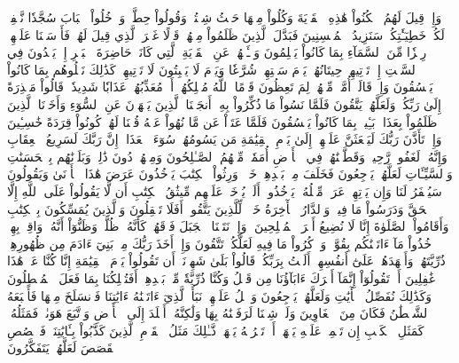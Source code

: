 وَإِذۡ قِيلَ لَهُمُ ٱسۡكُنُواْ هَٰذِهِ ٱلۡقَرۡيَةَ وَكُلُواْ مِنۡهَا حَيۡثُ شِئۡتُمۡ وَقُولُواْ حِطَّةٞ وَٱدۡخُلُواْ ٱلۡبَابَ سُجَّدٗا نَّغۡفِرۡ لَكُمۡ خَطِيٓـَٰٔتِكُمۡۚ سَنَزِيدُ ٱلۡمُحۡسِنِينَ
فَبَدَّلَ ٱلَّذِينَ ظَلَمُواْ مِنۡهُمۡ قَوۡلًا غَيۡرَ ٱلَّذِي قِيلَ لَهُمۡ فَأَرۡسَلۡنَا عَلَيۡهِمۡ رِجۡزٗا مِّنَ ٱلسَّمَآءِ بِمَا كَانُواْ يَظۡلِمُونَ
وَسۡـَٔلۡهُمۡ عَنِ ٱلۡقَرۡيَةِ ٱلَّتِي كَانَتۡ حَاضِرَةَ ٱلۡبَحۡرِ إِذۡ يَعۡدُونَ فِي ٱلسَّبۡتِ إِذۡ تَأۡتِيهِمۡ حِيتَانُهُمۡ يَوۡمَ سَبۡتِهِمۡ شُرَّعٗا وَيَوۡمَ لَا يَسۡبِتُونَ لَا تَأۡتِيهِمۡۚ كَذَٰلِكَ نَبۡلُوهُم بِمَا كَانُواْ يَفۡسُقُونَ
وَإِذۡ قَالَتۡ أُمَّةٞ مِّنۡهُمۡ لِمَ تَعِظُونَ قَوۡمًا ٱللَّهُ مُهۡلِكُهُمۡ أَوۡ مُعَذِّبُهُمۡ عَذَابٗا شَدِيدٗاۖ قَالُواْ مَعۡذِرَةً إِلَىٰ رَبِّكُمۡ وَلَعَلَّهُمۡ يَتَّقُونَ
فَلَمَّا نَسُواْ مَا ذُكِّرُواْ بِهِۦٓ أَنجَيۡنَا ٱلَّذِينَ يَنۡهَوۡنَ عَنِ ٱلسُّوٓءِ وَأَخَذۡنَا ٱلَّذِينَ ظَلَمُواْ بِعَذَابِۭ بَـِٔيسِۭ بِمَا كَانُواْ يَفۡسُقُونَ
فَلَمَّا عَتَوۡاْ عَن مَّا نُهُواْ عَنۡهُ قُلۡنَا لَهُمۡ كُونُواْ قِرَدَةً خَٰسِـِٔينَ
وَإِذۡ تَأَذَّنَ رَبُّكَ لَيَبۡعَثَنَّ عَلَيۡهِمۡ إِلَىٰ يَوۡمِ ٱلۡقِيَٰمَةِ مَن يَسُومُهُمۡ سُوٓءَ ٱلۡعَذَابِۗ إِنَّ رَبَّكَ لَسَرِيعُ ٱلۡعِقَابِ وَإِنَّهُۥ لَغَفُورٞ رَّحِيمٞ
وَقَطَّعۡنَٰهُمۡ فِي ٱلۡأَرۡضِ أُمَمٗاۖ مِّنۡهُمُ ٱلصَّـٰلِحُونَ وَمِنۡهُمۡ دُونَ ذَٰلِكَۖ وَبَلَوۡنَٰهُم بِٱلۡحَسَنَٰتِ وَٱلسَّيِّـَٔاتِ لَعَلَّهُمۡ يَرۡجِعُونَ
فَخَلَفَ مِنۢ بَعۡدِهِمۡ خَلۡفٞ وَرِثُواْ ٱلۡكِتَٰبَ يَأۡخُذُونَ عَرَضَ هَٰذَا ٱلۡأَدۡنَىٰ وَيَقُولُونَ سَيُغۡفَرُ لَنَا وَإِن يَأۡتِهِمۡ عَرَضٞ مِّثۡلُهُۥ يَأۡخُذُوهُۚ أَلَمۡ يُؤۡخَذۡ عَلَيۡهِم مِّيثَٰقُ ٱلۡكِتَٰبِ أَن لَّا يَقُولُواْ عَلَى ٱللَّهِ إِلَّا ٱلۡحَقَّ وَدَرَسُواْ مَا فِيهِۗ وَٱلدَّارُ ٱلۡأٓخِرَةُ خَيۡرٞ لِّلَّذِينَ يَتَّقُونَۚ أَفَلَا تَعۡقِلُونَ
وَٱلَّذِينَ يُمَسِّكُونَ بِٱلۡكِتَٰبِ وَأَقَامُواْ ٱلصَّلَوٰةَ إِنَّا لَا نُضِيعُ أَجۡرَ ٱلۡمُصۡلِحِينَ
۞وَإِذۡ نَتَقۡنَا ٱلۡجَبَلَ فَوۡقَهُمۡ كَأَنَّهُۥ ظُلَّةٞ وَظَنُّوٓاْ أَنَّهُۥ وَاقِعُۢ بِهِمۡ خُذُواْ مَآ ءَاتَيۡنَٰكُم بِقُوَّةٖ وَٱذۡكُرُواْ مَا فِيهِ لَعَلَّكُمۡ تَتَّقُونَ
وَإِذۡ أَخَذَ رَبُّكَ مِنۢ بَنِيٓ ءَادَمَ مِن ظُهُورِهِمۡ ذُرِّيَّتَهُمۡ وَأَشۡهَدَهُمۡ عَلَىٰٓ أَنفُسِهِمۡ أَلَسۡتُ بِرَبِّكُمۡۖ قَالُواْ بَلَىٰ شَهِدۡنَآۚ أَن تَقُولُواْ يَوۡمَ ٱلۡقِيَٰمَةِ إِنَّا كُنَّا عَنۡ هَٰذَا غَٰفِلِينَ
أَوۡ تَقُولُوٓاْ إِنَّمَآ أَشۡرَكَ ءَابَآؤُنَا مِن قَبۡلُ وَكُنَّا ذُرِّيَّةٗ مِّنۢ بَعۡدِهِمۡۖ أَفَتُهۡلِكُنَا بِمَا فَعَلَ ٱلۡمُبۡطِلُونَ
وَكَذَٰلِكَ نُفَصِّلُ ٱلۡأٓيَٰتِ وَلَعَلَّهُمۡ يَرۡجِعُونَ
وَٱتۡلُ عَلَيۡهِمۡ نَبَأَ ٱلَّذِيٓ ءَاتَيۡنَٰهُ ءَايَٰتِنَا فَٱنسَلَخَ مِنۡهَا فَأَتۡبَعَهُ ٱلشَّيۡطَٰنُ فَكَانَ مِنَ ٱلۡغَاوِينَ
وَلَوۡ شِئۡنَا لَرَفَعۡنَٰهُ بِهَا وَلَٰكِنَّهُۥٓ أَخۡلَدَ إِلَى ٱلۡأَرۡضِ وَٱتَّبَعَ هَوَىٰهُۚ فَمَثَلُهُۥ كَمَثَلِ ٱلۡكَلۡبِ إِن تَحۡمِلۡ عَلَيۡهِ يَلۡهَثۡ أَوۡ تَتۡرُكۡهُ يَلۡهَثۚ ذَّـٰلِكَ مَثَلُ ٱلۡقَوۡمِ ٱلَّذِينَ كَذَّبُواْ بِـَٔايَٰتِنَاۚ فَٱقۡصُصِ ٱلۡقَصَصَ لَعَلَّهُمۡ يَتَفَكَّرُونَ
